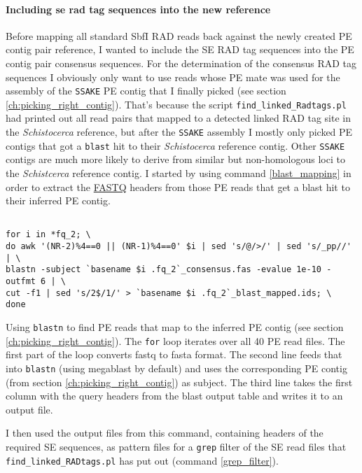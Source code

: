 \documentclass[a4paper,12pt,times,authoryear,twoside,print,index]{Classes/PhDThesisPSnPDF}\usepackage[]{graphicx}\usepackage[]{color}
\begin{document}
\paragraph{Including se rad tag sequences into the new reference}
Before mapping all standard SbfI RAD reads back against the newly created PE contig pair reference, I wanted to include the SE \gls{RAD tag} sequences into the PE contig pair consensus sequences. For the determination of the consensus \gls{RAD tag} sequences I obviously only want to use reads whose PE mate was used for the assembly of the \texttt{SSAKE} PE contig that I finally picked (see section \ref{ch:picking_right_contig}). That's because the script \texttt{find\_linked\_Radtags.pl} had printed out all read pairs that mapped to a detected \gls{linked RAD tag site} in the \textit{Schistocerca} reference, but after the \texttt{SSAKE} assembly I mostly only picked PE contigs that got a \texttt{blast} hit to their \textit{Schistocerca} reference contig. Other \texttt{SSAKE} contigs are much more likely to derive from similar but non-homologous loci to the \textit{Schistcerca} reference contig. I started by using command \ref{blast_mapping} in order to extract the \href{http://en.wikipedia.org/wiki/FASTQ_format}{FASTQ} headers from those PE reads that get a blast hit to their inferred PE contig.
%
\begin{cmd}
\captionsetup{type=cmd}
\begin{Verbatim}[fontsize=\scriptsize, formatcom=\color{darkgray}]

for i in *fq_2; \
do awk '(NR-2)%4==0 || (NR-1)%4==0' $i | sed 's/@/>/' | sed 's/_pp//' | \
blastn -subject `basename $i .fq_2`_consensus.fas -evalue 1e-10 -outfmt 6 | \
cut -f1 | sed 's/2$/1/' > `basename $i .fq_2`_blast_mapped.ids; \
done
\end{Verbatim}
\caption{\small Using \texttt{blastn} to find PE reads that map to the inferred PE contig (see section \vref{ch:picking_right_contig}). The \texttt{for} loop iterates over all 40 PE read files. The first part of the loop converts fastq to fasta format. The second line feeds that into \texttt{blastn} (using megablast by default) and uses the corresponding PE contig (from section \ref{ch:picking_right_contig}) as subject. The third line takes the first column with the query headers from the blast output table and writes it to an output file.
}
\label{blast_mapping} 
\end{cmd}
%
I then used the output files from this command, containing headers of the required SE sequences, as pattern files for a \texttt{grep} filter of the SE read files that \texttt{find\_linked\_RADtags.pl} has put out (command \ref{grep_filter}).
\end{document}
